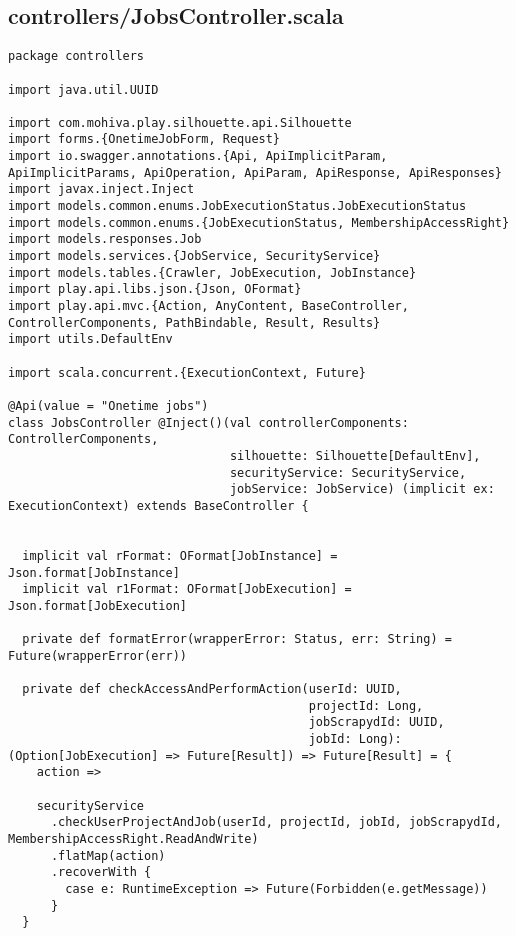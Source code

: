 \subsection{controllers/JobsController.scala}
\begin{lstlisting}
package controllers

import java.util.UUID

import com.mohiva.play.silhouette.api.Silhouette
import forms.{OnetimeJobForm, Request}
import io.swagger.annotations.{Api, ApiImplicitParam, ApiImplicitParams, ApiOperation, ApiParam, ApiResponse, ApiResponses}
import javax.inject.Inject
import models.common.enums.JobExecutionStatus.JobExecutionStatus
import models.common.enums.{JobExecutionStatus, MembershipAccessRight}
import models.responses.Job
import models.services.{JobService, SecurityService}
import models.tables.{Crawler, JobExecution, JobInstance}
import play.api.libs.json.{Json, OFormat}
import play.api.mvc.{Action, AnyContent, BaseController, ControllerComponents, PathBindable, Result, Results}
import utils.DefaultEnv

import scala.concurrent.{ExecutionContext, Future}

@Api(value = "Onetime jobs")
class JobsController @Inject()(val controllerComponents: ControllerComponents,
                               silhouette: Silhouette[DefaultEnv],
                               securityService: SecurityService,
                               jobService: JobService) (implicit ex: ExecutionContext) extends BaseController {


  implicit val rFormat: OFormat[JobInstance] = Json.format[JobInstance]
  implicit val r1Format: OFormat[JobExecution] = Json.format[JobExecution]

  private def formatError(wrapperError: Status, err: String) = Future(wrapperError(err))

  private def checkAccessAndPerformAction(userId: UUID,
                                          projectId: Long,
                                          jobScrapydId: UUID,
                                          jobId: Long): (Option[JobExecution] => Future[Result]) => Future[Result] = {
    action =>

    securityService
      .checkUserProjectAndJob(userId, projectId, jobId, jobScrapydId, MembershipAccessRight.ReadAndWrite)
      .flatMap(action)
      .recoverWith {
        case e: RuntimeException => Future(Forbidden(e.getMessage))
      }
  }


\end{lstlisting}
